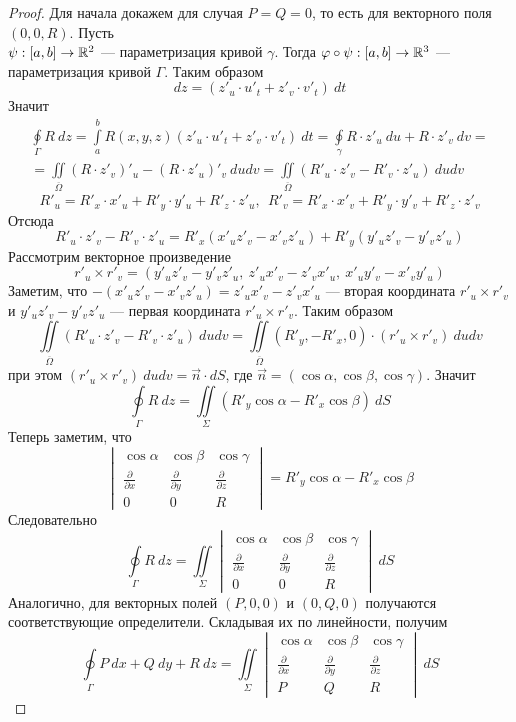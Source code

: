\begin{proof}
    Для начала докажем для случая $P=Q=0$, то есть для векторного поля $(0,0,R)$. Пусть\\
    $\psi:[a,b]\to \mathbb{R}^2$ --- параметризация кривой $\gamma$. Тогда $\varphi\circ\psi:[a,b]\to \mathbb{R}^3$ --- параметризация кривой $\Gamma$. Таким образом
    \[dz=(z'_u\cdot u'_t+z'_v\cdot v'_t)\ dt\]
    Значит
    \begin{multline*}
        \oint\limits_{\Gamma}R\ dz=\int\limits_{a}^{b}R(x,y,z)(z'_u\cdot u'_t+z'_v\cdot v'_t)\ dt=\oint\limits_{\gamma}R\cdot z'_u\ du+R\cdot z'_v\ dv=\\
        =\iint\limits_{\overline{\Omega}}(R\cdot z'_v)'_u-(R\cdot z'_u)'_v\ dudv=\iint\limits_{\overline{\Omega}}(R'_u\cdot z'_v-R'_v\cdot z'_u)\ dudv
    \end{multline*}
    \[R'_u=R'_x\cdot x'_u+R'_y\cdot y'_u+R'_z\cdot z'_u,\ \ R'_v=R'_x\cdot x'_v+R'_y\cdot y'_v+R'_z\cdot z'_v\]
    Отсюда
    \[R'_u\cdot z'_v-R'_v\cdot z'_u=R'_x(x'_u z'_v-x'_v z'_u)+R'_y(y'_u z'_v-y'_v z'_u)\]
    Рассмотрим векторное произведение
    \[r'_u\times r'_v=(y'_u z'_v-y'_v z'_u,\ z'_u x'_v-z'_v x'_u,\ x'_u y'_v-x'_v y'_u)\]
    Заметим, что $-(x'_u z'_v-x'_v z'_u)=z'_u x'_v-z'_v x'_u$ --- вторая координата $r'_u\times r'_v$ и $y'_u z'_v-y'_v z'_u$ --- первая координата $r'_u\times r'_v$. Таким образом
    \[\iint\limits_{\overline{\Omega}} (R'_u\cdot z'_v-R'_v\cdot z'_u)\ dudv=\iint\limits_{\overline{\Omega}}(R'_y,-R'_x,0)\cdot (r'_u\times r'_v)\ dudv\]
    при этом $(r'_u\times r'_v)\ dudv=\vec{n}\cdot dS$, где $\vec{n}=(\cos{\alpha},\cos{\beta},\cos{\gamma})$. Значит
    \[\oint\limits_{\Gamma}R\ dz=\iint\limits_{\Sigma}(R'_y \cos{\alpha}-R'_x \cos{\beta})\ dS\]
    Теперь заметим, что
    \[\begin{vmatrix}
        \cos{\alpha} & \cos{\beta} & \cos{\gamma}\\
        \frac{\partial}{\partial x} & \frac{\partial}{\partial y} & \frac{\partial}{\partial z}\\
        0 & 0 & R
    \end{vmatrix}=R'_y \cos{\alpha}-R'_x \cos{\beta}\]
    Следовательно
    \[\oint\limits_{\Gamma}R\ dz=\iint\limits_{\Sigma} \begin{vmatrix}
        \cos{\alpha} & \cos{\beta} & \cos{\gamma}\\
        \frac{\partial}{\partial x} & \frac{\partial}{\partial y} & \frac{\partial}{\partial z}\\
        0 & 0 & R
    \end{vmatrix}\ dS\]
    Аналогично, для векторных полей $(P,0,0)$ и $(0,Q,0)$ получаются соответствующие определители. Складывая их по линейности, получим
    \[\oint\limits_{\Gamma}P\ dx+Q\ dy+R\ dz=\iint\limits_{\Sigma} \begin{vmatrix}
        \cos{\alpha} & \cos{\beta} & \cos{\gamma}\\
        \frac{\partial}{\partial x} & \frac{\partial}{\partial y} & \frac{\partial}{\partial z}\\
        P & Q & R
    \end{vmatrix}\ dS\]
\end{proof}
